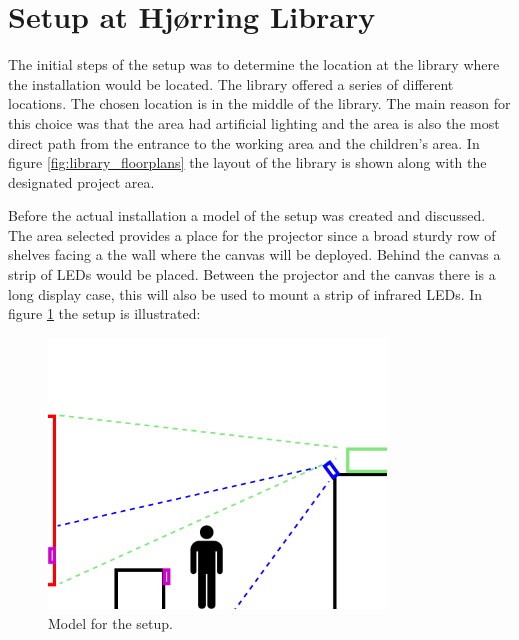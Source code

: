 \section{Setup at Hj{\o}rring Library}
The initial steps of the setup was to determine the location at the library where the installation would be located. The library offered a series of different locations. The chosen location is in the middle of the library. The main reason for this choice was that the area had artificial lighting and the area is also the most direct path from the entrance to the working area and the children's area. In figure \ref{fig:library_floorplans} the layout of the library is shown along with the designated project area.


Before the actual installation a model of the setup was created and discussed. The area selected provides a place for the projector since a broad sturdy row of shelves facing a the wall where the canvas will be deployed. Behind the canvas a strip of LEDs would be placed. Between the projector and the canvas there is a long display case, this will also be used to mount a strip of infrared LEDs. In figure \ref{fig:setup_model} the setup is illustrated:

\begin{figure}[htbp] 
\centering 
\includegraphics[width=0.8\textwidth]{Pictures/Setup/sideview_camera_with_person_two_strips.png} 
\caption{Model for the setup.} 
\label{fig:setup_model} 
\end{figure}

